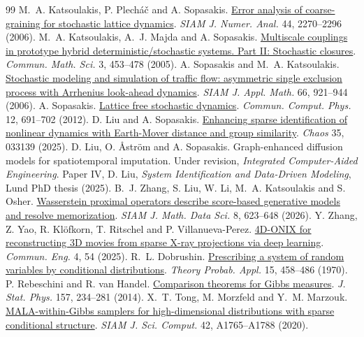 \documentclass[12pt,a4paper]{article}
\begin{document}
\begin{thebibliography}{99}
\setlength{\itemsep}{0pt}\setlength{\parskip}{0pt}
 M.~A. Katsoulakis, P. Plech\'a\v{c} and A. Sopasakis. \href{https://doi.org/10.1137/050637339}{Error analysis of coarse-graining for stochastic lattice dynamics}. \emph{SIAM J. Numer. Anal.} 44, 2270--2296 (2006).
 M.~A. Katsoulakis, A.~J. Majda and A. Sopasakis. \href{https://doi.org/10.4310/CMS.2005.v3.n3.a9}{Multiscale couplings in prototype hybrid deterministic/stochastic systems. Part II: Stochastic closures}. \emph{Commun. Math. Sci.} 3, 453--478 (2005).
 A. Sopasakis and M.~A. Katsoulakis. \href{https://doi.org/10.1137/040617790}{Stochastic modeling and simulation of traffic flow: asymmetric single exclusion process with Arrhenius look-ahead dynamics}. \emph{SIAM J. Appl. Math.} 66, 921--944 (2006).
 A. Sopasakis. \href{https://doi.org/10.4208/cicp.110211.200611a}{Lattice free stochastic dynamics}. \emph{Commun. Comput. Phys.} 12, 691--702 (2012).
 D. Liu and A. Sopasakis. \href{https://doi.org/10.1063/5.0214404}{Enhancing sparse identification of nonlinear dynamics with Earth-Mover distance and group similarity}. \emph{Chaos} 35, 033139 (2025).
 D. Liu, O. \AA{}str\"om and A. Sopasakis. Graph-enhanced diffusion models for spatiotemporal imputation. Under revision, \emph{Integrated Computer-Aided Engineering}. Paper IV, D. Liu, \emph{System Identification and Data-Driven Modeling}, Lund PhD thesis (2025).
 B.~J. Zhang, S. Liu, W. Li, M.~A. Katsoulakis and S. Osher. \href{https://doi.org/10.1137/24M1644584}{Wasserstein proximal operators describe score-based generative models and resolve memorization}. \emph{SIAM J. Math. Data Sci.} 8, 623--648 (2026).
 Y. Zhang, Z. Yao, R. Kl\"ofkorn, T. Ritschel and P. Villanueva-Perez. \href{https://doi.org/10.1038/s44172-025-00390-w}{4D-ONIX for reconstructing 3D movies from sparse X-ray projections via deep learning}. \emph{Commun. Eng.} 4, 54 (2025).
 R.~L. Dobrushin. \href{https://doi.org/10.1137/1115049}{Prescribing a system of random variables by conditional distributions}. \emph{Theory Probab. Appl.} 15, 458--486 (1970).
 P. Rebeschini and R. van Handel. \href{https://doi.org/10.1007/s10955-014-1087-7}{Comparison theorems for Gibbs measures}. \emph{J. Stat. Phys.} 157, 234--281 (2014).
 X.~T. Tong, M. Morzfeld and Y.~M. Marzouk. \href{https://doi.org/10.1137/19M1284014}{MALA-within-Gibbs samplers for high-dimensional distributions with sparse conditional structure}. \emph{SIAM J. Sci. Comput.} 42, A1765--A1788 (2020).

\end{thebibliography}
\end{document}
